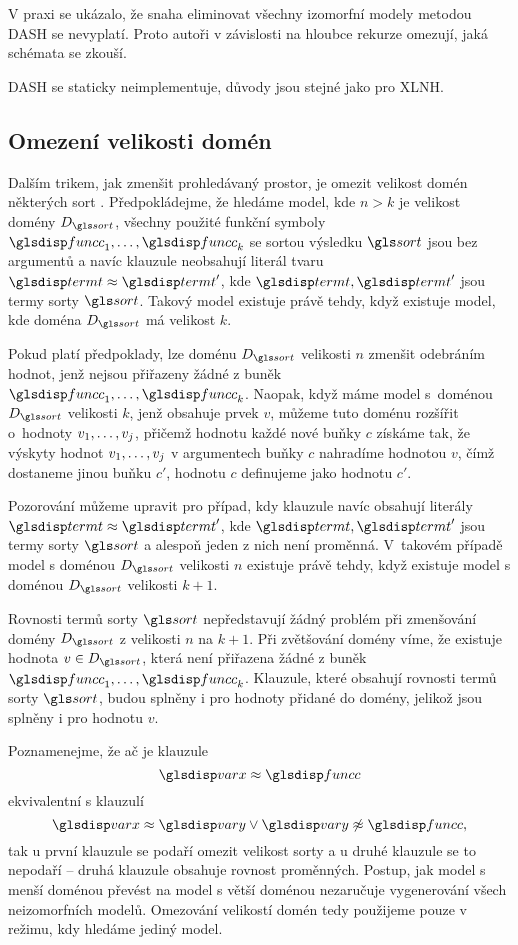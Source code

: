 V praxi se ukázalo, že snaha eliminovat všechny izomorfní modely
metodou DASH se nevyplatí. Proto autoři \cite{dash}
v závislosti na hloubce rekurze  omezují,
jaká schémata se zkouší.


DASH se staticky neimplementuje, důvody jsou stejné jako pro XLNH.

\subsection{Omezení velikosti domén}

Dalším trikem, jak zmenšit prohledávaný prostor, je omezit velikost
domén ně\-kte\-rých sort \cite{claessen03paradox}.
Předpokládejme, že hledáme model, kde $n > k$
je velikost domény $D_\sort$, všechny použité funkční symboly
$\funcC_1 \comdots \funcC_k$ se sortou
výsledku $\sort$ jsou bez argumentů a navíc klauzule neobsahují literál
tvaru $\term \approx \term'$, kde $\term, \term'$ jsou termy sorty
$\sort$. Takový model existuje právě tehdy, když
existuje model, kde doména $D_\sort$ má velikost $k$.

Pokud platí předpoklady, lze doménu $D_\sort$ velikosti
$n$ zmenšit odebráním hodnot, jenž nejsou přiřazeny žádné z buněk
$\funcC_1 \comdots \funcC_k$.
Naopak, když máme model s~doménou $D_\sort$ velikosti $k$,
jenž obsahuje prvek $v$, můžeme tuto doménu rozšířit o~hodnoty
$v_1 , \ldots, v_j$, přičemž hodnotu každé nové buňky $c$ získáme
tak, že výskyty hodnot $v_1 , \ldots, v_j$ v argumentech buňky $c$ nahradíme
hodnotou $v$, čímž dostaneme jinou buňku $c'$, hodnotu $c$
definujeme jako hodnotu $c'$.

Pozorování můžeme upravit pro případ, kdy klauzule navíc obsahují
literály $\term \approx \term'$,
kde $\term, \term'$ jsou termy sorty $\sort$ a alespoň jeden
z nich není proměnná.
V~takovém případě model s doménou $D_\sort$ velikosti $n$ existuje
právě tehdy, když existuje model s doménou $D_\sort$ velikosti $k + 1$.

Rovnosti termů sorty $\sort$ nepředstavují žádný problém při
zmenšování domény $D_\sort$ z velikosti $n$ na $k + 1$. Při zvětšování domény
víme, že existuje hodnota $v \in D_\sort$, která není přiřazena žádné z buněk
$\funcC_1 \comdots \funcC_k$. Klauzule, které obsahují rovnosti
termů sorty $\sort$, budou splněny i pro hodnoty přidané do domény,
jelikož jsou splněny i pro hodnotu $v$.

Poznamenejme, že ač je klauzule
\[
  \var \approx \funcC
\]
ekvivalentní s klauzulí
\[
  \var \approx \varY \vee \varY \not\approx \funcC,
\]
tak u první klauzule se podaří omezit velikost sorty a u druhé
klauzule se to nepodaří -- druhá klauzule obsahuje rovnost proměnných.
Postup, jak model s menší doménou převést na model s větší doménou
nezaručuje vygenerování všech neizomorfních modelů.
Omezování velikostí domén tedy použijeme pouze v režimu,
kdy hledáme jediný model.

